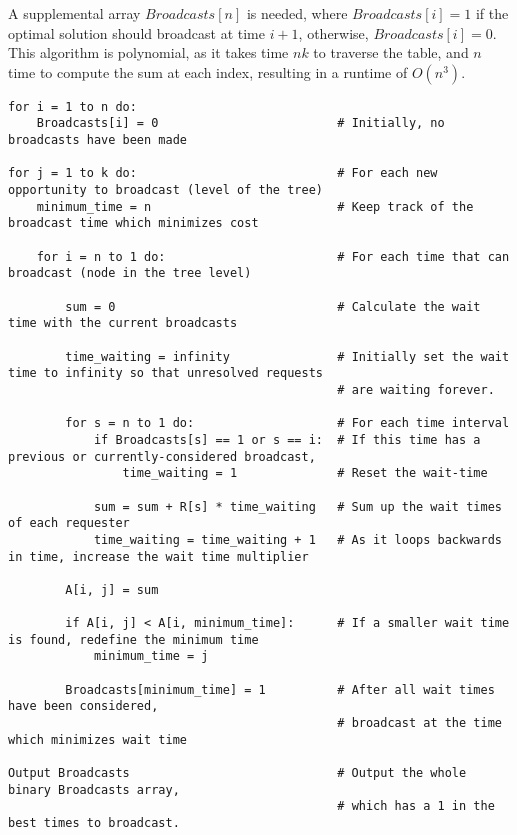 \documentclass[letterpaper,notitlepage,twoside]{article}
\begin{document}
A supplemental array $Broadcasts[n]$ is needed, where $Broadcasts[i] = 1$ if the optimal solution should broadcast at time $i + 1$, otherwise, $Broadcasts[i] = 0$.
This algorithm is polynomial, as it takes time $nk$ to traverse the table, and $n$ time to compute the sum at each index, resulting in a runtime of $O(n^3)$.
\begin{verbatim}
for i = 1 to n do:
    Broadcasts[i] = 0                         # Initially, no broadcasts have been made

for j = 1 to k do:                            # For each new opportunity to broadcast (level of the tree)
    minimum_time = n                          # Keep track of the broadcast time which minimizes cost
    
    for i = n to 1 do:                        # For each time that can broadcast (node in the tree level)  
  
        sum = 0                               # Calculate the wait time with the current broadcasts
  
        time_waiting = infinity               # Initially set the wait time to infinity so that unresolved requests
                                              # are waiting forever.

        for s = n to 1 do:                    # For each time interval
            if Broadcasts[s] == 1 or s == i:  # If this time has a previous or currently-considered broadcast,
                time_waiting = 1              # Reset the wait-time
                
            sum = sum + R[s] * time_waiting   # Sum up the wait times of each requester
            time_waiting = time_waiting + 1   # As it loops backwards in time, increase the wait time multiplier
                
        A[i, j] = sum
            
        if A[i, j] < A[i, minimum_time]:      # If a smaller wait time is found, redefine the minimum time
            minimum_time = j
        
        Broadcasts[minimum_time] = 1          # After all wait times have been considered,
                                              # broadcast at the time which minimizes wait time

Output Broadcasts                             # Output the whole binary Broadcasts array,
                                              # which has a 1 in the best times to broadcast.
\end{verbatim}
\end{document}
